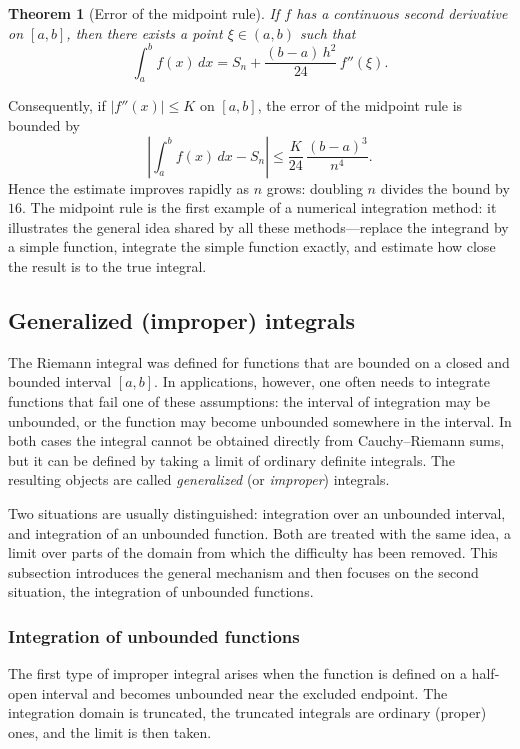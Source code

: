 \documentclass[11pt,a4paper]{article}
\theoremstyle{definition} \newtheorem{definition}{Definition} \theoremstyle{plain} \newtheorem{theorem}{Theorem}
\begin{document}
\begin{theorem}[Error of the midpoint rule]\label{thm:midpoint-error}
If $f$ has a continuous second derivative on $[a,b]$, then there exists a
point $\xi\in(a,b)$ such that
\[
\int_a^b f(x)\,dx = S_n + \frac{(b-a)\,h^2}{24}\,f''(\xi).
\]
\end{theorem}

Consequently, if $|f''(x)|\le K$ on $[a,b]$, the error of the midpoint rule is bounded by
\[
\left|\int_a^b f(x)\,dx - S_n\right|
    \le \frac{K}{24}\,\frac{(b-a)^3}{n^4}.
\]
Hence the estimate improves rapidly as $n$ grows: doubling $n$ divides the bound by $16$.
The midpoint rule is the first example of a numerical integration method: it illustrates the general idea shared by all these methods---replace the integrand by a simple function, integrate the simple function exactly, and estimate how close the result is to the true integral.
\subsection{Generalized (improper) integrals}

The Riemann integral was defined for functions that are bounded on a closed
and bounded interval $[a,b]$.  In applications, however, one often needs to
integrate functions that fail one of these assumptions: the interval of
integration may be unbounded, or the function may become unbounded somewhere
in the interval.  In both cases the integral cannot be obtained directly from
Cauchy--Riemann sums, but it can be defined by taking a limit of ordinary
definite integrals.  The resulting objects are called \emph{generalized} (or
\emph{improper}) integrals.

Two situations are usually distinguished: integration over an unbounded
interval, and integration of an unbounded function.  Both are treated with
the same idea, a limit over parts of the domain from which the difficulty has
been removed.  This subsection introduces the general mechanism and then
focuses on the second situation, the integration of unbounded functions.

\subsubsection{Integration of unbounded functions}

The first type of improper integral arises when the function is defined on a
half-open interval and becomes unbounded near the excluded endpoint.  The
integration domain is truncated, the truncated integrals are ordinary (proper)
ones, and the limit is then taken.
\end{document}
